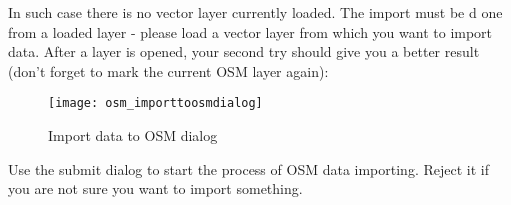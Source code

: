 In such case there is no vector layer currently loaded. The import must be d
one from a loaded layer - please load a vector layer from which you want to 
import data. After a layer is opened, your second try should give you a 
better result (don't forget to mark the current OSM layer again):

\begin{figure}[ht]
   \begin{center}
   \caption{Import data to OSM dialog \nixcaption}\label{fig:osmimporttoosm}\smallskip
   \texttt{[image: osm\_importtoosmdialog]}
\end{center}
\end{figure}

Use the submit dialog to start the process of OSM data importing.
Reject it if you are not sure you want to import something.

